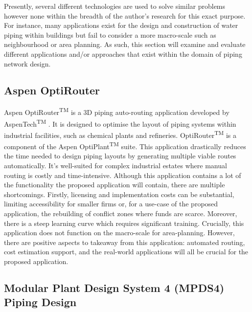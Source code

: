 Presently, several different technologies are used to solve similar problems however none within the breadth of the author's research for this exact purpose. For instance, many applications exist for the design and construction of water piping within buildings but fail to consider a more macro-scale such as neighbourhood or area planning. As such, this section will examine and evaluate different applications and/or approaches that exist within the domain of piping network design.

\subsection{Aspen OptiRouter}\label{aspenoptirouter}

Aspen OptiRouter\textsuperscript{TM} is a 3D piping auto-routing application developed by AspenTech\textsuperscript{TM}  \citep{aspentech_2025}. It is designed to optimise the layout of piping systems within industrial facilities, such as chemical plants and refineries. OptiRouter\textsuperscript{TM} is a component of the Aspen OptiPlant\textsuperscript{TM} suite. This application drastically reduces the time needed to design piping layouts by generating multiple viable routes automatically. It's well-suited for complex industrial estates where manual routing is costly and time-intensive.\newline
Although this application contains a lot of the functionality the proposed application will contain, there are multiple shortcomings. Firstly, licensing and implementation costs can be substantial, limiting accessibility for smaller firms or, for a use-case of the proposed application, the rebuilding of conflict zones where funds are scarce. Moreover, there is a steep learning curve which requires significant training. Crucially, this application does not function on the macro-scale for area-planning.\newline
However, there are positive aspects to takeaway from this application: automated routing, cost estimation support, and the real-world applications will all be crucial for the proposed application.

\subsection{Modular Plant Design System 4 (MPDS4) Piping Design}

